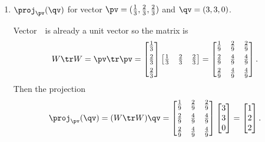 \begin{example}
\begin{enumerate}
\item \(\proj_\pv(\qv)\) for vector \(\pv=(\tfrac13,\tfrac23,\tfrac23)\) and \(\qv=(3,3,0)\).
\begin{solution} 
Vector~\pv\ is already a unit vector so the matrix is
\begin{equation*}
W\tr W=\pv\tr\pv=\begin{bmatrix} \tfrac13\\[1ex]\tfrac23\\[1ex]\tfrac23 \end{bmatrix}
\begin{bmatrix} \tfrac13&\tfrac23&\tfrac23 \end{bmatrix}
=\begin{bmatrix} \tfrac19&\tfrac29&\tfrac29\\[1ex]
\tfrac29&\tfrac49&\tfrac49\\[1ex]
\tfrac29&\tfrac49&\tfrac49 \end{bmatrix}.
\end{equation*}
Then the projection
\begin{equation*}
\proj_\pv(\qv)=(W\tr W)\qv
=\begin{bmatrix} \tfrac19&\tfrac29&\tfrac29\\[1ex]
\tfrac29&\tfrac49&\tfrac49\\[1ex]
\tfrac29&\tfrac49&\tfrac49 \end{bmatrix}
\begin{bmatrix} 3\\3\\0 \end{bmatrix}
=\begin{bmatrix} 1\\2\\2 \end{bmatrix}.
\end{equation*}
\end{solution}
\end{enumerate}
\end{example}




